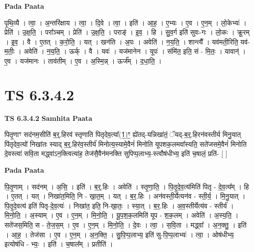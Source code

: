 \documentclass[17pt]{extarticle}
\begin{document}
\textbf{Pada Paata} \newline

पृ॒थि॒व्यै । त्वा॒ । अ॒न्तरि॑क्षाय । त्वा॒ । दि॒वे । त्वा॒ । इति॑ । आ॒ह॒ । ए॒भ्यः । ए॒व । ए॒न॒म् । लो॒केभ्यः॑ । प्रेति॑ । उ॒क्ष॒ति॒ । परा᳚ञ्चम् । प्रेति॑ । उ॒क्ष॒ति॒ । पराङ्॑ । इ॒व॒ । हि । सु॒व॒र्ग इति॑ सुवः-गः । लो॒कः । क्रू॒रम् । इ॒व॒ । वै । ए॒तत् । क॒रो॒ति॒ । यत् । खन॑ति । अ॒पः । अवेति॑ । न॒य॒ति॒ । शान्त्यै᳚ । यव॑मती॒रिति॒ यव॑-म॒तीः॒ । अवेति॑ । न॒य॒ति॒ । ऊर्क् । वै । यवः॑ । यज॑मानेन । यूपः॑ । संमि॑त॒ इति॒ सं - मि॒तः॒ । यावान्॑ । ए॒व । यज॑मानः । ताव॑तीम् । ए॒व । अ॒स्मि॒न्न् । ऊर्ज᳚म् । द॒धा॒ति॒ ।  \newline




\section*{ TS 6.3.4.2 }

\textbf{TS 6.3.4.2 } \newline
\textbf{Samhita Paata} \newline

पितृ॒णाꣳ सद॑नम॒सीति॑ ब॒र्॒.हिरव॑ स्तृणाति पितृदेव॒त्या᳚(1॒)ꣳ॒ ह्ये॑तद्-यन्निखा॑तं॒ ॅयद्-ब॒र्॒.हिरन॑वस्तीर्य मिनु॒यात् पि॑तृदेव॒त्यो॑ निखा॑तः स्याद् ब॒र्॒.हिर॑व॒स्तीर्य॑ मिनोत्य॒स्यामे॒वैनं॑ मिनोति यूपशक॒लमवा᳚स्यति॒ सते॑जसमे॒वैनं॑ मिनोति दे॒वस्त्वा॑ सवि॒ता मद्ध्वा॑ऽन॒क्त्वित्या॑ह॒ तेज॑सै॒वैन॑मनक्ति सुपिप्प॒लाभ्य॒-स्त्वौष॑धीभ्य॒ इति॑ च॒षालं॒ प्रति॑- [  ] \newline

\textbf{Pada Paata} \newline

पि॒तृ॒णाम् । सद॑नम् । अ॒सि॒ । इति॑ । ब॒र्॒.हिः । अवेति॑ । स्तृ॒णा॒ति॒ । पि॒तृ॒दे॒व॒त्य॑मिति॑ पितृ - दे॒व॒त्य᳚म् । हि । ए॒तत् । यत् । निखा॑त॒मिति॒ नि - खा॒त॒म् । यत् । ब॒र॒.हिः । अन॑वस्ती॒र्येत्यन॑व - स्ती॒र्य॒ । मि॒नु॒यात् । पि॒तृ॒दे॒वत्य॑ इति॑ पितृ-दे॒व॒त्यः॑ । निखा॑त॒ इति॒ नि-खा॒तः॒ । स्या॒त् । ब॒र॒.हिः । अ॒व॒स्तीर्येत्य॑व - स्तीर्य॑ । मि॒नो॒ति॒ । अ॒स्याम् । ए॒व । ए॒न॒म् । मि॒नो॒ति॒ । यू॒प॒श॒क॒लमिति॑ यूप - श॒क॒लम् । अवेति॑ । अ॒स्य॒ति॒ । सते॑जस॒मिति॒ स - ते॒ज॒स॒म् । ए॒व । ए॒न॒म् । मि॒नो॒ति॒ । दे॒वः । त्वा॒ । स॒वि॒ता । मद्ध्वा᳚ । अ॒न॒क्तु॒ । इति॑ । आ॒ह॒ । तेज॑सा । ए॒व । ए॒न॒म् । अ॒न॒क्ति॒ । सु॒पि॒प्प॒लाभ्य॒ इति॑ सु-पि॒प्प॒लाभ्यः॑ । त्वा॒ । ओष॑धीभ्य॒ इत्योष॑धि - भ्यः॒ । इति॑ । च॒षाल᳚म् । प्रतीति॑ ।  \newline
\end{document}

